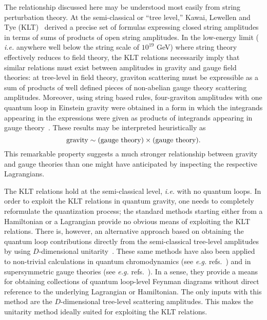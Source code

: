 \documentclass[12pt]{livrev}
\begin{document}
The relationship discussed here may be understood most easily from
string perturbation theory.  At the semi-classical or ``tree level,''
Kawai, Lewellen and Tye (KLT)~\cite{KLT} derived a precise set of
formulas expressing closed string amplitudes in terms of sums of
products of open string amplitudes.  In the low-energy limit ({\it
i.e.} anywhere well below the string scale of $10^{19}$ GeV) where
string theory effectively reduces to field theory, the KLT relations
necessarily imply that similar relations must exist between amplitudes in
gravity and gauge field theories: at tree-level in field theory, graviton
scattering must be expressible as a sum of products of well defined
pieces of non-abelian gauge theory scattering amplitudes.  Moreover,
using string based rules, four-graviton amplitudes with one quantum
loop in Einstein gravity were obtained in a form in which the integrands
appearing in the expressions were given as products of integrands
appearing in gauge theory~\cite{BDS,DunbarNorridge95}.  These results may
be interpreted heuristically as
%
\begin{equation}
\hbox{gravity} \sim \hbox{(gauge theory)} \times  \hbox{(gauge theory)}.
\label{HeuristicFormula}
\end{equation}
%
This remarkable property suggests a much stronger relationship between
gravity and gauge theories than one might have anticipated by
inspecting the respective Lagrangians.

The KLT relations hold at the semi-classical level, {\it i.e.} with no
quantum loops.  In order to exploit the KLT relations in quantum
gravity, one needs to completely reformulate the quantization process;
the standard methods starting either from a Hamiltonian or a
Lagrangian provide no obvious means of exploiting the KLT relations.
There is, however, an alternative approach based on obtaining the
quantum loop contributions directly from the semi-classical tree-level
amplitudes by using $D$-dimensional
unitarity~\cite{Bern94SusyFour,Bern95SusyFour,BernMorgan,Review,Rozowsky}.
These same methods have also been applied to non-trivial calculations
in quantum chromodynamics (see {\it e.g.}
refs.~\cite{BernMorgan,Bern00QCDApplications,Bern02QCDApplications})
 and in supersymmetric gauge
theories (see {\it e.g.}
refs.~\cite{Bern94SusyFour,Bern95SusyFour,BRY,BDDPR}).  In a sense,
they provide a means for obtaining collections of quantum loop-level
Feynman diagrams without direct reference to the underlying Lagrangian
or Hamiltonian.  The only inputs with this method are the
$D$-dimensional tree-level scattering amplitudes.  This makes the
unitarity method ideally suited for exploiting the KLT relations.
\end{document}
